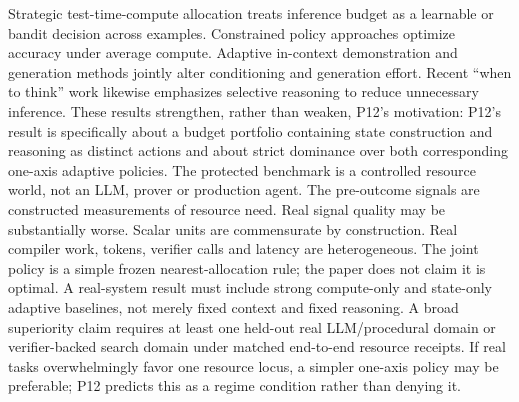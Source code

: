 \markdownRendererDocumentBegin
\markdownRendererSectionBegin
{}\markdownRendererInterblockSeparator
{}Strategic test-time-compute allocation treats inference budget as a learnable or bandit decision across examples. Constrained policy approaches optimize accuracy under average compute. Adaptive in-context demonstration and generation methods jointly alter conditioning and generation effort. Recent “when to think” work likewise emphasizes selective reasoning to reduce unnecessary inference.\markdownRendererInterblockSeparator
{}These results strengthen, rather than weaken, P12's motivation:  P12's result is specifically about a budget portfolio containing state construction and reasoning as distinct actions and about strict dominance over both corresponding one-axis adaptive policies.\markdownRendererInterblockSeparator
{}\markdownRendererSectionBegin
{}\markdownRendererInterblockSeparator
{}\markdownRendererOlBeginTight
{}The protected benchmark is a controlled resource world, not an LLM, prover or production agent.\markdownRendererOlItemEnd 
{}The pre-outcome signals are constructed measurements of resource need. Real signal quality may be substantially worse.\markdownRendererOlItemEnd 
{}Scalar units are commensurate by construction. Real compiler work, tokens, verifier calls and latency are heterogeneous.\markdownRendererOlItemEnd 
{}The joint policy is a simple frozen nearest-allocation rule; the paper does not claim it is optimal.\markdownRendererOlItemEnd 
{}A real-system result must include strong compute-only and state-only adaptive baselines, not merely fixed context and fixed reasoning.\markdownRendererOlItemEnd 
{}A broad superiority claim requires at least one held-out real LLM/procedural domain or verifier-backed search domain under matched end-to-end resource receipts.\markdownRendererOlItemEnd 
{}If real tasks overwhelmingly favor one resource locus, a simpler one-axis policy may be preferable; P12 predicts this as a regime condition rather than denying it.\markdownRendererOlItemEnd 
\markdownRendererOlEndTight 
\markdownRendererSectionEnd 
\markdownRendererSectionEnd \markdownRendererDocumentEnd
